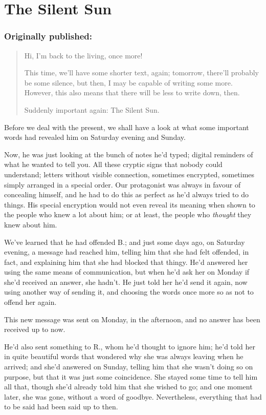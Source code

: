 \chapter{The Silent Sun}
\label{cha:silent-sun}
\subsection*{Originally published: }
\begin{quote}
Hi, I'm back to the living, once more!

This time, we'll have some shorter text, again; tomorrow, there'll probably be some silence, but then, I may be capable of writing some more. However, this also means that there will be less to write down, then.

Suddenly important again: The Silent Sun.
\end{quote}

Before we deal with the present, we shall have a look at what some important words had revealed him on Saturday evening and Sunday.

Now, he was just looking at the bunch of notes he'd typed; digital reminders of what he wanted to tell you. All these cryptic signs that nobody could understand; letters without visible connection, sometimes encrypted, sometimes simply arranged in a special order. Our protagonist was always in favour of concealing himself, and he had to do this as perfect as he'd always tried to do things. His special encryption would not even reveal its meaning when shown to the people who knew a lot about him; or at least, the people who \emph{thought} they knew about him.

We've learned that he had offended B.; and just some days ago, on Saturday evening, a message had reached him, telling him that she had felt offended, in fact, and explaining him that she had blocked that thingy. He'd answered her using the same means of communication, but when he'd ask her on Monday if she'd received an answer, she hadn't. He just told her he'd send it again, now using another way of sending it, and choosing the words once more so as not to offend her again.

This new message was sent on Monday, in the afternoon, and no answer has been received up to now.

He'd also sent something to R., whom he'd thought to ignore him; he'd told her in quite beautiful words that wondered why she was always leaving when he arrived; and she'd answered on Sunday, telling him that she wasn't doing so on purpose, but that it was just some coincidence. She stayed some time to tell him all that, though she'd already told him that she wished to go; and one moment later, she was gone, without a word of goodbye. Nevertheless, everything that had to be said had been said up to then.

